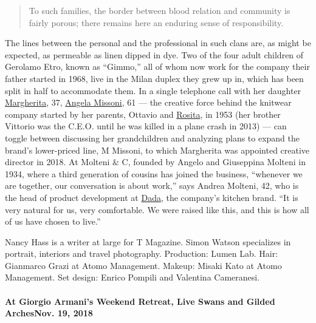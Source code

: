 \begin{quote}
To such families, the border between blood relation and community is
fairly porous; there remains here an enduring sense of responsibility.
\end{quote}

The lines between the personal and the professional in such clans are,
as might be expected, as permeable as linen dipped in dye. Two of the
four adult children of Gerolamo Etro, known as ``Gimmo,'' all of whom
now work for the company their father started in 1968, live in the Milan
duplex they grew up in, which has been split in half to accommodate
them. In a single telephone call with her daughter
\href{https://www.nytimes.com/2018/01/02/t-magazine/margherita-missoni-amos-juice-recipe.html}{Margherita},
37,
\href{https://www.nytimes.com/2016/12/05/t-magazine/fashion/angela-missoni-hand-collection.html}{Angela
Missoni}, 61 --- the creative force behind the knitwear company started
by her parents, Ottavio and
\href{https://www.nytimes.com/2017/07/11/t-magazine/rosita-missoni-garden-home.html}{Rosita},
in 1953 (her brother Vittorio was the C.E.O. until he was killed in a
plane crash in 2013) --- can toggle between discussing her grandchildren
and analyzing plans to expand the brand's lower-priced line, M Missoni,
to which Margherita was appointed creative director in 2018. At Molteni
\& C, founded by Angelo and Giuseppina Molteni in 1934, where a third
generation of cousins has joined the business, ``whenever we are
together, our conversation is about work,'' says Andrea Molteni, 42, who
is the head of product development at
\href{https://www.dada-kitchens.com/us/}{Dada}, the company's kitchen
brand. ``It is very natural for us, very comfortable. We were raised
like this, and this is how all of us have chosen to live.''

Nancy Hass is a writer at large for T Magazine. Simon Watson specializes
in portrait, interiors and travel photography. Production: Lumen Lab.
Hair: Gianmarco Grazi at Atomo Management. Makeup: Misaki Kato at Atomo
Management. Set design: Enrico Pompili and Valentina Cameranesi.

\href{https://www.nytimes.com/2018/11/19/t-magazine/giorgio-armani-home-broni-italy.html}{}

\hypertarget{at-giorgio-armanis-weekend-retreat-live-swans-and-gilded-archesnov-19-2018}{%
\paragraph{At Giorgio Armani's Weekend Retreat, Live Swans and Gilded
ArchesNov. 19,
2018}\label{at-giorgio-armanis-weekend-retreat-live-swans-and-gilded-archesnov-19-2018}}


